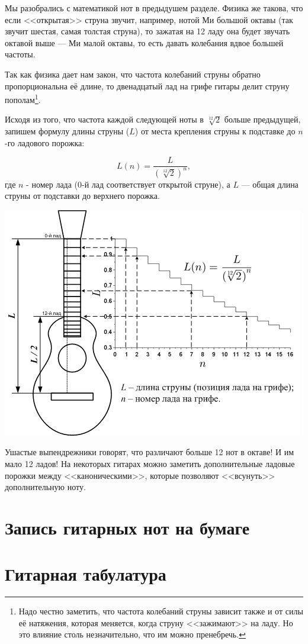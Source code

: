 Мы разобрались с математикой нот в предыдушем разделе. Физика же такова, что если <<открытая>> струна звучит, например, нотой Ми большой октавы (так звучит шестая, самая толстая струна), то зажатая на 12 ладу она будет звучать октавой выше --- Ми малой октавы, то есть давать колебания вдвое большей частоты. 

Так как физика дает нам закон, что частота колебаний струны обратно пропорциональна её длине, то двенадцатый лад на грифе гитары делит струну пополам\footnote{Надо честно заметить, что частота колебаний струны зависит также и от силы её натяжения, которая меняется, когда струну <<зажимают>> на ладу. Но это влияние столь незначительно, что им можно пренебречь.}.

Исходя из того, что частота каждой следующей ноты в $\sqrt[12]{2}$ больше предыдущей, запишем формулу длины струны ($L$) от места крепления струны к подставке до $n$-го ладового порожка:

\[L(n)=\frac{L}{(\sqrt[12]{2})^n},\]
где $n$ - номер лада ($0$-й лад соответствует открытой струне), а $L$ --- общая длина струны от подставки до верхнего порожка.


\includegraphics{fig/string-length.png}

Ушастые выпендрежники говорят, что различают больше 12 нот в октаве! И им мало 12 ладов! На некоторых гитарах можно заметить дополнительные ладовые порожки между <<каноническими>>, которые позволяют <<всунуть>> дополнительную ноту.



\section{Запись гитарных нот на бумаге}

\section{Гитарная табулатура}

